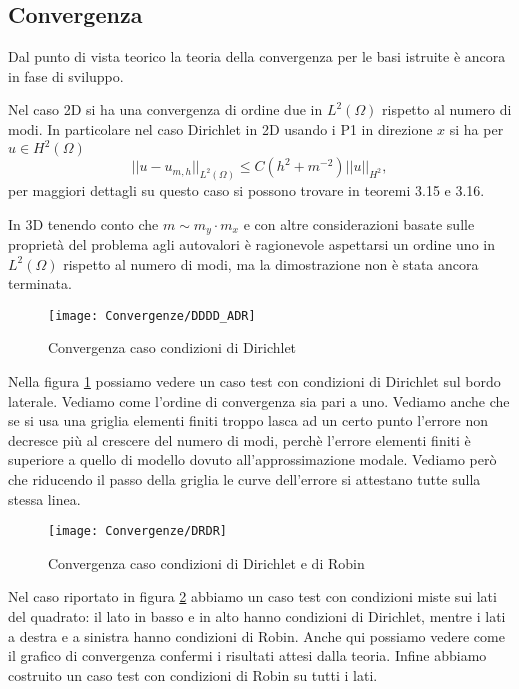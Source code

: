\subsection*{Convergenza}
Dal punto di vista teorico la teoria della convergenza per le basi istruite \`e ancora in fase di sviluppo.

Nel caso 2D si ha una convergenza di ordine due in $L^2(\Omega)$ rispetto al numero di modi.
In particolare nel caso Dirichlet in 2D usando i P1 in direzione $x$ si ha per $u\in H^2(\Omega)$
\begin{equation}
 \label{eq:stimainl2}
 ||u-u_{m,h}||_{L^2(\Omega)}\leq C ( h^2+m^{-2}) ||u||_{H^2},
\end{equation}
per maggiori dettagli su questo caso si possono trovare in \cite{zilio:himod} teoremi 3.15 e 3.16.

In 3D tenendo conto che $m\sim m_y\cdot m_x$ e con altre considerazioni basate sulle propriet\`a del problema agli autovalori
\`e ragionevole aspettarsi un ordine uno in $L^2(\Omega)$ rispetto al numero di modi, ma la dimostrazione 
non \`e stata ancora terminata.

\begin{figure}[!h]
\centering
\texttt{[image: Convergenze/DDDD\_ADR]}
\caption{Convergenza caso condizioni di Dirichlet}
\label{fig:ddddconv}
\end{figure}

Nella figura \ref{fig:ddddconv} possiamo vedere un caso test con condizioni di Dirichlet sul bordo laterale. Vediamo 
come l'ordine di convergenza sia pari a uno. Vediamo anche che se si usa una griglia elementi finiti troppo 
lasca ad un certo punto l'errore non decresce pi\`u al crescere del numero di modi, perch\`e 
l'errore elementi finiti \`e superiore a quello di modello dovuto all'approssimazione modale.
Vediamo per\`o che riducendo il passo della griglia le curve dell'errore si attestano tutte sulla stessa linea.

\begin{figure}[!h]
\centering
\texttt{[image: Convergenze/DRDR]}
\caption{Convergenza caso condizioni di Dirichlet e di Robin}
\label{fig:drdrconv}
\end{figure}

Nel caso riportato in figura \ref{fig:drdrconv} abbiamo un caso test con condizioni miste sui lati del quadrato:
il lato in basso e in alto hanno condizioni di Dirichlet, mentre i lati a destra e a sinistra hanno condizioni di Robin.
Anche qui possiamo vedere come il grafico di convergenza confermi i risultati attesi dalla teoria.
Infine abbiamo costruito un caso test con condizioni di Robin su tutti i lati. 

